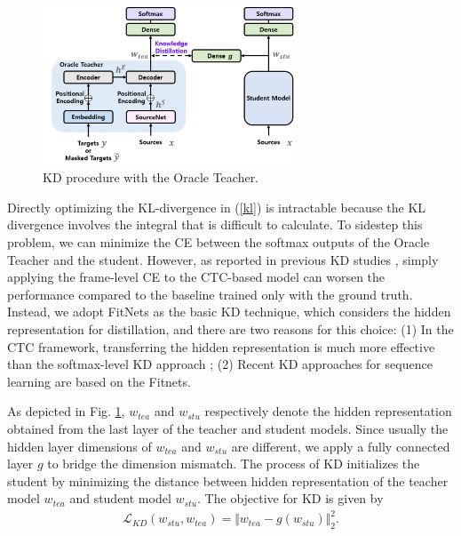 \documentclass[journal]{IEEEtran}
\begin{document}
\begin{figure}[t]
\centering
	\includegraphics[height=4.7cm]{kd.png}
	\caption{KD procedure with the Oracle Teacher.}
	\label{oracle_kd}
\end{figure}
Directly optimizing the KL-divergence in (\ref{kl}) is intractable because the KL divergence involves the integral that is difficult to calculate.
To sidestep this problem, we can minimize the CE between the softmax outputs of the Oracle Teacher and the student.
However, as reported in previous KD studies \cite{senior-et-al:scheme,takashima-et-al:scheme, takashima-et-al2:scheme}, simply applying the frame-level CE to the CTC-based model can worsen the performance compared to the baseline trained only with the ground truth.
Instead, we adopt FitNets \cite{romero-et-al:scheme} as the basic KD technique, which considers the hidden representation for distillation, and there are two reasons for this choice: (1) In the CTC framework, transferring the hidden representation is much more effective than the softmax-level KD approach \cite{tutornet:scheme}; (2) Recent KD approaches for sequence learning \cite{tutornet:scheme,distillhubert:scheme,fithubert} are based on the Fitnets.

As depicted in Fig. \ref{oracle_kd}, $w_{tea}$ and $w_{stu}$ respectively denote the hidden representation obtained from the last layer of the teacher and student models.
Since usually the hidden layer dimensions of $w_{tea}$ and $w_{stu}$ are different, we apply a fully connected layer $g$ to bridge the dimension mismatch. The process of KD initializes the student by minimizing the distance between hidden representation of the teacher model $w_{tea}$ and student model $w_{stu}$.
The objective for KD is given by
\begin{align}
\label{hidden}
   \mathcal{L}_{KD}(w_{stu}, w_{tea}) =\Vert{w_{tea}-g(w_{stu})}\Vert_2^2.
\end{align}%
\end{document}
